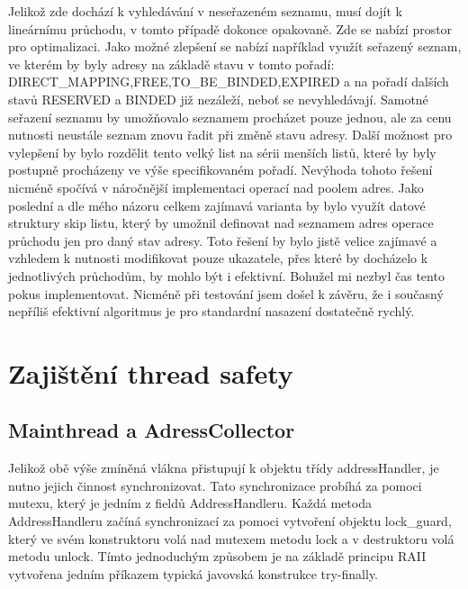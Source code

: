 \documentclass[12pt,a4paper]{report}
\begin{document}
Jelikož zde dochází k vyhledávání v neseřazeném seznamu, musí dojít k lineárnímu průchodu, v tomto případě dokonce opakovaně. Zde se nabízí prostor pro optimalizaci. Jako možné zlepšení se nabízí například využít seřazený seznam, ve kterém by byly adresy na základě stavu v tomto pořadí: DIRECT\_MAPPING,FREE,TO\_BE\_BINDED,EXPIRED a na pořadí dalších stavů RESERVED a BINDED již nezáleží, neboť se nevyhledávají. Samotné seřazení seznamu by umožňovalo seznamem procházet pouze jednou, ale za cenu nutnosti neustále seznam znovu řadit při změně stavu adresy. Další možnost pro vylepšení by bylo rozdělit tento velký list na sérii menších listů, které by byly postupně procházeny ve výše specifikovaném pořadí. Nevýhoda tohoto řešení nicméně spočívá v náročnější implementaci operací nad poolem adres. Jako poslední a dle mého názoru celkem zajímavá varianta by bylo využít datové struktury skip listu, který by umožnil definovat nad seznamem adres operace průchodu jen pro daný stav adresy. Toto řešení by bylo jistě velice zajímavé a vzhledem k nutnosti modifikovat pouze ukazatele, přes které by docházelo k jednotlivých průchodům, by mohlo být i efektivní. Bohužel mi nezbyl čas tento pokus implementovat. Nicméně při testování jsem došel k závěru, že i současný nepříliš efektivní algoritmus je pro standardní nasazení dostatečně rychlý.
\section{Zajištění thread safety}
\subsection*{Mainthread a AdressCollector}
Jelikož obě výše zmíněná vlákna přistupují k objektu  třídy addressHandler, je nutno jejich činnost synchronizovat. Tato synchronizace probíhá za pomoci mutexu, který je jedním z fieldů AddressHandleru. Každá metoda AddressHandleru začíná synchronizací za pomoci vytvoření objektu lock\_guard, který ve svém konstruktoru volá nad mutexem metodu lock a v destruktoru volá metodu unlock. Tímto jednoduchým způsobem je na základě principu RAII vytvořena jedním příkazem typická javovská konstrukce try-finally.
\end{document}
